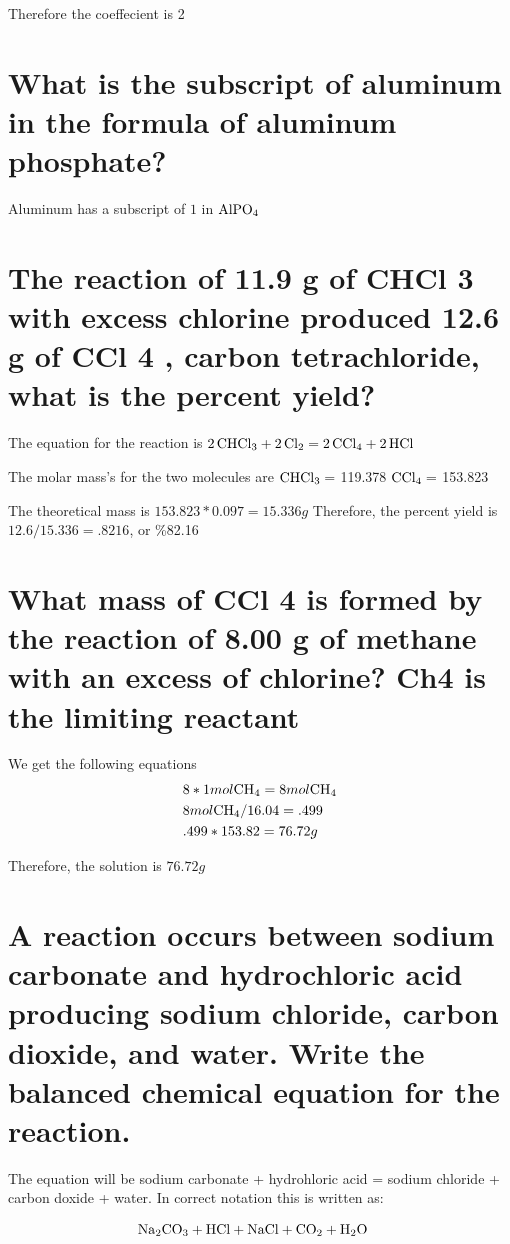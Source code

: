 \documentclass{scrartcl}
\begin{document}
Therefore the coeffecient is 2

\section{What is the subscript of aluminum in the formula of aluminum phosphate?}
\label{sec:org1f5335e}
Aluminum has a subscript of \(1\) in \(\ce{AlPO4}\)

\section{The reaction of 11.9 g of CHCl 3 with excess chlorine produced 12.6 g of CCl 4 , carbon tetrachloride, what is the percent yield?}
\label{sec:org365d74e}
The equation for the reaction is
\(\ce{2CHCl3 + 2Cl2}=\ce{2CCl4 + 2HCl}\)

The molar mass's for the two molecules are
\(\ce{CHCl3}=\) 119.378
\(\ce{CCl4}=\) 153.823

The theoretical mass is \(153.823 * 0.097 = 15.336g\)
Therefore, the percent yield is \(12.6/15.336 = .8216\), or \%82.16

\section{What mass of CCl 4 is formed by the reaction of 8.00 g of methane with an excess of chlorine? Ch4 is the limiting reactant}
\label{sec:org0b66e3a}
We get the following equations
\begin{align*}
&8*1mol\ce{CH4}=8mol\ce{CH4}\\
&8mol\ce{CH4}/16.04=.499\\
&.499*153.82=76.72g\\
\end{align*}

Therefore, the solution is \(76.72g\)

\section{A reaction occurs between sodium carbonate and hydrochloric acid producing sodium chloride, carbon dioxide, and water. Write the balanced chemical equation for the reaction.}
\label{sec:org46c75a2}

The equation will be sodium carbonate + hydrohloric acid = sodium chloride +
carbon doxide + water. In correct notation this is written as:

\begin{align*}
&\ce{Na2CO3 + HCl}+\ce{NaCl + CO2 + H2O}
\end{align*}
\end{document}
